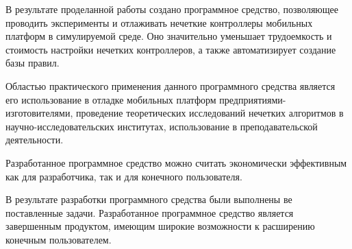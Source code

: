 
В результате проделанной работы создано программное средство, позволяющее проводить эксперименты и отлаживать нечеткие контроллеры мобильных платформ в симулируемой среде. Оно значительно уменьшает трудоемкость и стоимость настройки нечетких контроллеров, а также автоматизирует создание базы правил.

Областью практического применения данного программного средства является его использование в отладке мобильных платформ предприятиями-изготовителями, проведение теоретических исследований нечетких алгоритмов в научно-исследовательских институтах, использование в преподавательской деятельности.

Разработанное программное средство можно считать экономически эффективным как для разработчика, так и для конечного пользователя.

В результате разработки программного средства были выполнены ве поставленные задачи. Разработанное программное средство является завершенным продуктом, имеющим широкие возможности к расширению конечным пользователем.